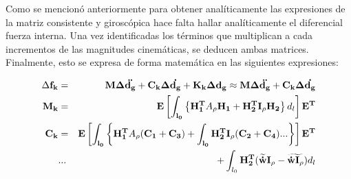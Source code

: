 Como se mencionó anteriormente para obtener analíticamente las expresiones de la matriz consistente y giroscópica hace falta hallar analíticamente el diferencial fuerza interna. Una vez identificadas los términos que multiplican a cada incrementos de las magnitudes cinemáticas, se deducen ambas matrices. Finalmente, esto se expresa de forma matemática en las siguientes expresiones:

\begin{eqnarray}
	\Delta \bf{f_k}&= &\bf{M} \Delta \ddot{\bf{d}_g}+\bf{C}_k \Delta \dot{\bf{d}_g}+\bf{K}_k \Delta \bf{d}_g\approx \bf{M} \Delta \ddot{\bf{d}_g}+\bf{C}_k \Delta \dot{\bf{d}_g}\\
	\label{Eqn:PRE:MatrizM}
	\bf{M_k}&=&\bf{E}\left [ \int _{l_0} \left \{ \bf{H}_1^T \text{$A_\rho$}\bf{H}_1 +\bf{H}_2^T\bf{I}_\rho\bf{H_2} \right \} \text{$d_l$} \right  ]\bf{E}^T\\
	\label{Eqn:PRE:MtarizC}
	\bf{C}_k&=&\bf{E}\left [ \int _{l_0} \left \{ \bf{H}_1^T \text{$A_\rho$}(\bf{C}_1+\bf{C}_3) +\int _{l_0}\bf{H}_2^T\bf{I}_\rho(\bf{C}_2+\bf{C}_4) ...\right \}\right  ]\bf{E}^T\\
	&...& +\int_{l_0} \bf{H}_2 ^T(\widetilde{\dot{w}}\bf{I}_\rho-\widetilde{\dot{w}\bf{I}_\rho}) \text{$d_l$}
\end{eqnarray}

\newpage

